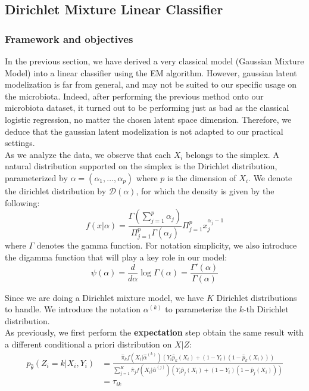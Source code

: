 \subsection{Dirichlet Mixture Linear Classifier}

\subsubsection{Framework and objectives}

In the previous section, we have derived a very classical model (Gaussian Mixture Model) into a linear classifier using the EM algorithm.
However, gaussian latent modelization is far from general, and may not be suited to our specific usage on the microbiota.
Indeed, after performing the previous method onto our microbiota dataset, it turned out to be performing just as bad as the classical logistic regression, no matter the chosen latent space dimension.
Therefore, we deduce that the gaussian latent modelization is not adapted to our practical settings. \\

As we analyze the data, we observe that each $X_i$ belongs to the simplex.
A natural distribution supported on the simplex is the Dirichlet distribution, parameterized by $\alpha = (\alpha_1, \dots, \alpha_p)$ where $p$ is the dimension of $X_i$.
We denote the dirichlet distribution by $\mathcal{D}(\alpha)$, for which the density is given by the following:
$$
f(x|\alpha) = \frac{\Gamma \left( \sum_{j=1}^p \alpha_j \right)}{\Pi_{j=1}^p \Gamma (\alpha_j)} \Pi_{j=1}^p x_j^{\alpha_j - 1}
$$
where $\Gamma$ denotes the gamma function.
For notation simplicity, we also introduce the digamma function that will play a key role in our model:
$$
\psi(\alpha) = \frac{d}{d \alpha} \log \Gamma(\alpha) = \frac{\Gamma '(\alpha)}{\Gamma(\alpha)}
$$

Since we are doing a Dirichlet mixture model, we have $K$ Dirichlet distributions to handle.
We introduce the notation $\alpha^{(k)}$ to parameterize the $k$-th Dirichlet distribution. \\

As previously, we first perform the \textbf{expectation} step obtain the same result with a different conditional a priori distribution on $X|Z$:
$$
\begin{align}
    p_{\widehat{\theta}}(Z_i = k | X_i, Y_i) &= \frac{\hat{\pi}_k f(X_i | \hat{\alpha}^{(k)}) (Y_i \hat{p}_k(X_i) + (1 - Y_i)(1 - \hat{p}_k(X_i)))}{\sum_{j=1}^K \hat{\pi}_j f(X_i | \hat{\alpha}^{(j)}) (Y_i \hat{p}_j(X_i) + (1 - Y_i)(1 - \hat{p}_j(X_i)))} \\
                                             &= \tau_{ik}
\end{align}
$$


